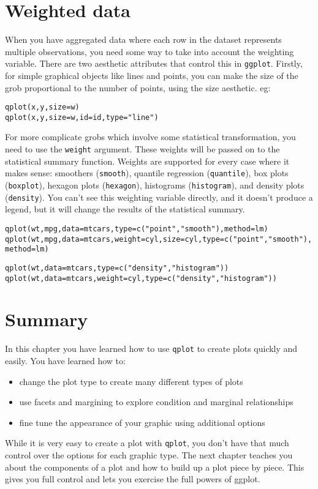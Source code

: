 \section{Weighted data}\label{sec:weighted_data}

When you have aggregated data where each row in the dataset represents multiple observations, you need some way to take into account the weighting variable.  There are two aesthetic attributes that control this in {\tt ggplot}.  Firstly, for simple graphical objects like lines and points, you can make the size of the grob proportional to the number of points, using the size aesthetic. eg:

\begin{alltt}
qplot(x, y, size=w)
qplot(x, y, size=w, id=id, type="line")
\end{alltt}

For more complicate grobs which involve some statistical transformation, you need to use the {\tt weight} argument.  These weights will be passed on to the statistical summary function.  Weights are supported for every case where it makes sense: smoothers ({\tt smooth}), quantile regression ({\tt quantile}), box plots ({\tt boxplot}), hexagon plots ({\tt hexagon}), histograms ({\tt histogram}), and density plots ({\tt density}).  You can't see this weighting variable directly, and it doesn't produce a legend, but it will change the results of the statistical summary.

\begin{alltt}
qplot(wt, mpg, data=mtcars, type=c("point", "smooth"), method=lm)
qplot(wt, mpg, data=mtcars, weight=cyl, size=cyl, type=c("point", "smooth"), method=lm)

qplot(wt, data=mtcars, type=c("density", "histogram"))
qplot(wt, data=mtcars, weight=cyl, type=c("density", "histogram"))
\end{alltt}



\section{Summary}

In this chapter you have learned how to use {\tt qplot} to create plots quickly and easily. You have learned how to:

\begin{itemize}
	\item change the plot type to create many different types of plots
	\item use facets and margining to explore condition and marginal relationships
	\item fine tune the appearance of your graphic using additional options
\end{itemize}

While it is very easy to create a plot with {\tt qplot}, you don't have that much control over the options for each graphic type.  The next chapter teaches you about the components of a plot and how to build up a plot piece by piece.  This gives you full control and lets you exercise the full powers of ggplot.  




